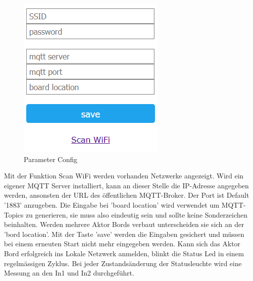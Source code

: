 \begin{figure}[H]
\begin{center}
\begin{minipage}[b]{.3\linewidth}
		\includegraphics[width=\textwidth]{graphics/Configportal2.PNG}
		\caption{Parameter Config}
	\end{minipage}
\end{center}
\end{figure}
Mit der Funktion Scan WiFi werden vorhanden Netzwerke angezeigt. Wird ein eigener MQTT Server installiert, kann an dieser Stelle die IP-Adresse angegeben werden, ansonsten der URL des öffentlichen MQTT-Broker. Der Port ist Default '1883' anzugeben. Die Eingabe bei 'board location' wird verwendet um MQTT-Topics zu generieren, sie muss also eindeutig sein und sollte keine Sonderzeichen beinhalten. Werden mehrere Aktor Bords verbaut unterscheiden sie sich an der 'bord location'. Mit der Taste 'save' werden die Eingaben gesichert und müssen bei einem erneuten Start nicht mehr eingegeben werden. Kann sich das Aktor Bord erfolgreich ins Lokale Netzwerk anmelden, blinkt die Status Led in einem regelmässigen Zyklus. Bei jeder Zustandsänderung der Statusleuchte wird eine Messung an den In1 und In2 durchgeführt. 

